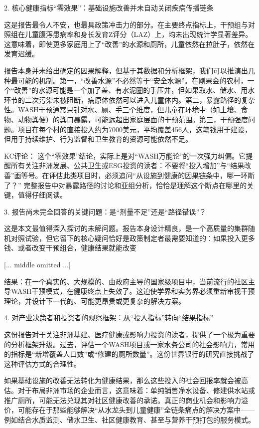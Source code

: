 \documentclass[11pt]{ctexart}
\begin{document}
2. 核心健康指标“零效果”：基础设施改善并未自动关闭疾病传播链条

这是报告最令人不安，也最具政策冲击力的部分。在主要终点指标上，干预组与对照组在儿童腹泻患病率和身长发育Z评分（LAZ）上，均未出现统计学显著差异。这意味着，即使更多家庭用上了“改善”的水源和厕所，儿童依然在拉肚子，依然在发育迟缓。

报告本身并未给出确定的因果解释，但基于其数据和分析框架，我们可以推演出几种最可能的机制。第一，“改善水源”不必然等于“安全水源”。在刚果金的农村，一个“改善”的水源可能是一个加了盖、有水泥圈的手压井，但如果取水、储水、用水环节的二次污染未被阻断，病原体依然可以进入儿童体内。第二，暴露路径的复杂性。WASH干预通常只针对水、厕、手三个维度，但儿童在环境中（如土壤、食物、动物粪便）的粪口暴露，可能远超出家庭层面的干预范围。第三，干预强度问题。项目在每个村的直接投入约为7000美元，平均覆盖456人，这笔钱用于建设，但用于持续维护、行为监督和卫生教育的资源可能依然不足。

KC评论： 这个“零效果”结论，实际上是对“WASH万能论”的一次强力纠偏。它提醒所有关注非洲发展、公共卫生或ESG投资的读者：不要将“投入增加”与“结果改善”画等号。在评估此类项目时，必须追问“从设施到健康的因果链条中，哪一环断了？” 完整报告中对暴露路径的讨论和亚组分析，恰恰是理解这个断点在哪里的关键，值得仔细阅读。

3. 报告尚未完全回答的关键问题：是“剂量不足”还是“路径错误”？

这是本文最值得深入探讨的未解问题。报告本身设计精良，是一个高质量的集群随机对照试验，但它留下的核心疑问恰好是政策制定者最需要知道的：如果投入更多钱、或者改变干预组合，健康结果就能改变

[... middle omitted ...]

结果：在一个真实的、大规模的、由政府主导的国家级项目中，当前流行的社区主导WASH干预模式，在健康终点上失效了。这迫使学界和实务界必须重新审视干预理论，并设计下一代的、可能更昂贵或更复杂的解决方案。

4. 对产业决策者和投资者的观察框架：从“投入指标”转向“结果指标”

这份报告对于关注非洲基建、医疗健康或影响力投资的读者，提供了一个极为重要的分析框架升级。过去，评估一个WASH项目或一家水务公司的社会影响力，常用的指标是“新增覆盖人口数”或“修建的厕所数量”。这份世界银行的研究直接挑战了这种评估方式的合理性。

如果基础设施的改善无法转化为健康结果，那么这些投入的社会回报率就会被高估。对于布局非洲市场的企业而言，这意味着：单纯销售净水设备、修建供水站或推广厕所，可能无法兑现其对社区健康改善的承诺。真正的商业机会和影响力溢价，可能存在于那些能够解决“从水龙头到儿童健康”全链条痛点的解决方案中——例如结合水质监测、储水卫生、社区健康教育、甚至与营养干预打包的服务模式。
\end{document}
